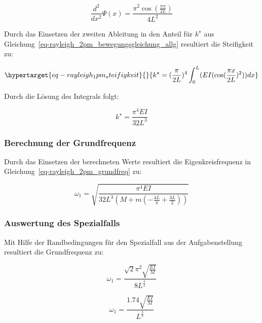 \documentclass[
  letterpaper,
  DIV=11]{scrreprt}
\begin{document}
\begin{equation}\frac{d^{2}}{d x^{2}} \Psi{\left(x \right)} = \frac{\pi^{2} \cos{\left(\frac{\pi x}{2 L} \right)}}{4 L^{2}}\end{equation}

Durch das Einsetzen der zweiten Ableitung in den Anteil für \(k^\star\)
aus Gleichung~\ref{eq-rayleigh_2pm_bewegungsgleichung_allg} resultiert
die Steifigkeit zu:

\begin{equation}\protect\hypertarget{eq-rayleigh_1pm_steifigkeit}{}{
k^\star = (\frac{\pi}{2L})^4 \int_0^L(EI(\cos(\frac{\pi x}{2L})^2)) dx
}\label{eq-rayleigh_1pm_steifigkeit}\end{equation}

Durch die Lösung des Integrals folgt:

\begin{equation}k^{\star} = \frac{\pi^{4} E I}{32 L^{3}}\end{equation}

\hypertarget{berechnung-der-grundfrequenz-1}{%
\subsubsection{Berechnung der
Grundfrequenz}\label{berechnung-der-grundfrequenz-1}}

Durch das Einsetzen der berechneten Werte resultiert die
Eigenkreisfrequenz in Gleichung~\ref{eq-rayleigh_2pm_grundfreq} zu:

\begin{equation}\omega_{1} = \sqrt{\frac{\pi^{4} E I}{32 L^{3} \left(M + m \left(- \frac{4 L}{\pi} + \frac{3 L}{2}\right)\right)}}\end{equation}

\hypertarget{auswertung-des-spezialfalls-1}{%
\subsubsection{Auswertung des
Spezialfalls}\label{auswertung-des-spezialfalls-1}}

Mit Hilfe der Randbedingungen für den Spezialfall aus der
Aufgabenstellung resultiert die Grundfrequenz zu:

\begin{equation}\omega_{1} = \frac{\sqrt{2} \pi^{2} \sqrt{\frac{E I}{M}}}{8 L^{\frac{3}{2}}}\end{equation}

\begin{equation}\omega_{1} = \frac{1.74 \sqrt{\frac{E I}{M}}}{L^{\frac{3}{2}}}\end{equation}
\end{document}
